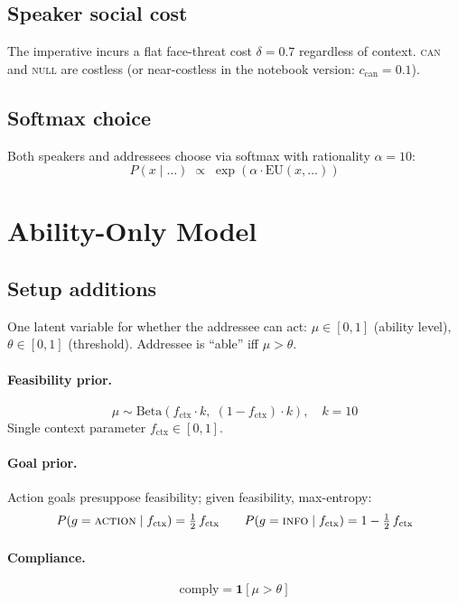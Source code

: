 \documentclass[11pt]{article}
\begin{document}
\subsection{Speaker social cost}

The imperative incurs a flat face-threat cost $\delta = 0.7$ regardless of context.
\textsc{can} and \textsc{null} are costless (or near-costless in the notebook
version: $c_{\text{can}} = 0.1$).

\subsection{Softmax choice}

Both speakers and addressees choose via softmax with rationality $\alpha = 10$:
\[
  P(x \mid \ldots) \;\propto\; \exp\!\left(\alpha \cdot \mathrm{EU}(x, \ldots)\right)
\]

\section{Ability-Only Model}
\label{sec:ability}

\subsection{Setup additions}

One latent variable for whether the addressee can act:
$\mu \in [0,1]$ (ability level), $\theta \in [0,1]$ (threshold). Addressee is
``able'' iff $\mu > \theta$.

\paragraph{Feasibility prior.}
\[
  \mu \sim \mathrm{Beta}\!\left(f_{\text{ctx}}\cdot k,\; (1 - f_{\text{ctx}})\cdot k\right), \quad k = 10
\]
Single context parameter $f_{\text{ctx}} \in [0,1]$.

\paragraph{Goal prior.} Action goals presuppose feasibility; given feasibility,
max-entropy:
\[
  P(g = \textsc{action} \mid f_{\text{ctx}}) = \tfrac{1}{2}\,f_{\text{ctx}}
  \qquad
  P(g = \textsc{info} \mid f_{\text{ctx}}) = 1 - \tfrac{1}{2}\,f_{\text{ctx}}
\]

\paragraph{Compliance.}
\[
  \text{comply} = \mathbf{1}[\mu > \theta]
\]
\end{document}
